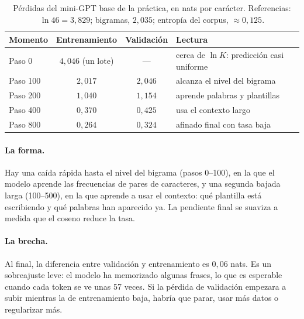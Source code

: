 \begin{table}[h]
\centering\small
\caption{Pérdidas del mini-GPT base de la práctica, en nats por carácter. Referencias: $\ln 46=3{,}829$; bigramas, $2{,}035$; entropía del corpus, $\approx 0{,}125$.}\label{tab:curva}
\begin{tabularx}{\textwidth}{@{}lcc>{\raggedright\arraybackslash}X@{}}
\toprule
Momento & Entrenamiento & Validación & Lectura \\
\midrule
Paso 0 & $4{,}046$ (un lote) & --- & cerca de $\ln K$: predicción casi uniforme \\
Paso 100 & $2{,}017$ & $2{,}046$ & alcanza el nivel del bigrama \\
Paso 200 & $1{,}040$ & $1{,}154$ & aprende palabras y plantillas \\
Paso 400 & $0{,}370$ & $0{,}425$ & usa el contexto largo \\
Paso 800 & $0{,}264$ & $0{,}324$ & afinado final con tasa baja \\
\bottomrule
\end{tabularx}
\end{table}

\paragraph{La forma.} Hay una caída rápida hasta el nivel del bigrama (pasos 0--100), en la que el modelo aprende las frecuencias de pares de caracteres, y una segunda bajada larga (100--500), en la que aprende a usar el contexto: qué plantilla está escribiendo y qué palabras han aparecido ya. La pendiente final se suaviza a medida que el coseno reduce la tasa.

\paragraph{La brecha.} Al final, la diferencia entre validación y entrenamiento es $0{,}06$ nats. Es un sobreajuste leve: el modelo ha memorizado algunas frases, lo que es esperable cuando cada token se ve unas 57 veces. Si la pérdida de validación empezara a subir mientras la de entrenamiento baja, habría que parar, usar más datos o regularizar más.

